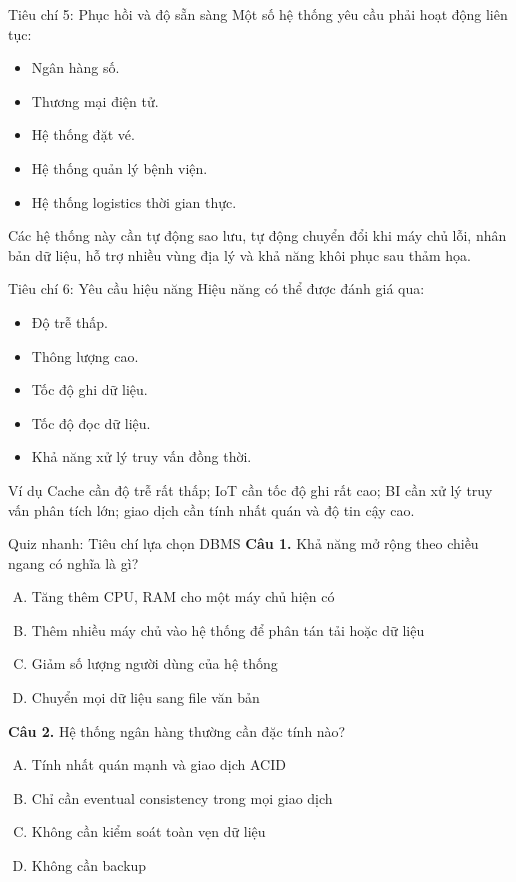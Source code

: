 \documentclass[aspectratio=169,11pt]{beamer}
\newcommand{\smallitem}{\setlength{\itemsep}{2pt}\setlength{\parskip}{0pt}}
\begin{document}
\begin{frame}{Tiêu chí 5: Phục hồi và độ sẵn sàng}
Một số hệ thống yêu cầu phải hoạt động liên tục:
\begin{itemize}
  \smallitem
  \item Ngân hàng số.
  \item Thương mại điện tử.
  \item Hệ thống đặt vé.
  \item Hệ thống quản lý bệnh viện.
  \item Hệ thống logistics thời gian thực.
\end{itemize}

Các hệ thống này cần tự động sao lưu, tự động chuyển đổi khi máy chủ lỗi, nhân bản dữ liệu, hỗ trợ nhiều vùng địa lý và khả năng khôi phục sau thảm họa.
\end{frame}

\begin{frame}{Tiêu chí 6: Yêu cầu hiệu năng}
Hiệu năng có thể được đánh giá qua:
\begin{itemize}
  \smallitem
  \item Độ trễ thấp.
  \item Thông lượng cao.
  \item Tốc độ ghi dữ liệu.
  \item Tốc độ đọc dữ liệu.
  \item Khả năng xử lý truy vấn đồng thời.
\end{itemize}

\begin{exampleblock}{Ví dụ}
Cache cần độ trễ rất thấp; IoT cần tốc độ ghi rất cao; BI cần xử lý truy vấn phân tích lớn; giao dịch cần tính nhất quán và độ tin cậy cao.
\end{exampleblock}
\end{frame}

\begin{frame}{Quiz nhanh: Tiêu chí lựa chọn DBMS}
\small
\textbf{Câu 1.} Khả năng mở rộng theo chiều ngang có nghĩa là gì?
\begin{enumerate}[A.]
  \item Tăng thêm CPU, RAM cho một máy chủ hiện có
  \item Thêm nhiều máy chủ vào hệ thống để phân tán tải hoặc dữ liệu
  \item Giảm số lượng người dùng của hệ thống
  \item Chuyển mọi dữ liệu sang file văn bản
\end{enumerate}

\textbf{Câu 2.} Hệ thống ngân hàng thường cần đặc tính nào?
\begin{enumerate}[A.]
  \item Tính nhất quán mạnh và giao dịch ACID
  \item Chỉ cần eventual consistency trong mọi giao dịch
  \item Không cần kiểm soát toàn vẹn dữ liệu
  \item Không cần backup
\end{enumerate}
\end{frame}
\end{document}
